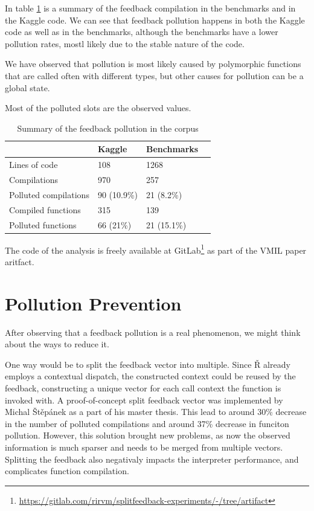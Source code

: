 In table \ref{tbl:pollution-summary} is a summary of the feedback compilation in the benchmarks and in the Kaggle code. We can see that feedback pollution happens in both the Kaggle code as well as in the benchmarks, although the benchmarks have a lower pollution rates, mostl likely due to the stable nature of the code.

We have observed that pollution is most likely caused by polymorphic functions that are called often with different types, but other causes for pollution can be a global state.

Most of the polluted slots are the observed values.

\begin{table}[H]
	\centering
	\begin{tabular}{llll}
		\hline
		                      & Kaggle      & Benchmarks  \\
		\hline
		Lines of code         & 108         & 1268        \\
		Compilations          & 970         & 257         \\
		Polluted compilations & 90 (10.9\%) & 21 (8.2\%)  \\
		Compiled functions    & 315         & 139         \\
		Polluted functions    & 66 (21\%)   & 21 (15.1\%) \\
		\hline
	\end{tabular}
  \caption{Summary of the feedback pollution in the corpus\cite{feedback-vmil}}\label{tbl:pollution-summary}
\end{table}


The code of the analysis is freely available at GitLab\footnote{\url{https://gitlab.com/rirvm/splitfeedback-experiments/-/tree/artifact}} as part of the VMIL paper\cite{feedback-vmil} aritfact.

\section{Pollution Prevention}

After observing that a feedback pollution is a real phenomenon, we might think about the ways to reduce it.

One way would be to split the feedback vector into multiple. Since Ř already employs a contextual dispatch, the constructed context could be reused by the feedback, constructing a unique vector for each call context the function is invoked with. A proof-of-concept split feedback vector was implemented by Michal Štěpánek as a part of his master thesis\cite{michal2025obohaceny}. This lead to around 30\% decrease in the number of polluted compilations and around 37\% decrease in funciton pollution. However, this solution brought new problems, as now the observed information is much sparser and needs to be merged from multiple vectors. Splitting the feedback also negativaly impacts the interpreter performance, and complicates function compilation.

